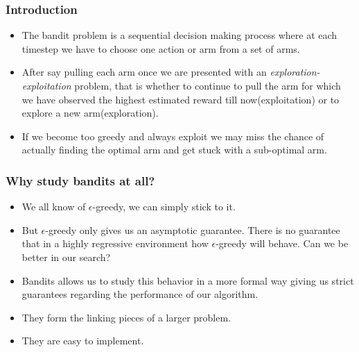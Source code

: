 \begin{frame}
\frametitle{Introduction}
\begin{itemize}
\item<1-> The bandit problem is a sequential decision making process where at each timestep we have to choose one action or arm from a set of arms. 
\item<2-> After say pulling each arm once we are presented with an \emph{exploration-exploitation}  problem, that is whether to continue to pull the arm for which we have observed the highest estimated reward till now(exploitation) or to explore a new arm(exploration). 
\item<3-> If we become too greedy and always exploit we may miss the chance of actually finding the optimal arm and get stuck with a sub-optimal arm.
\end{itemize}
\end{frame}

\begin{frame}
\frametitle{Why study bandits at all?}
\begin{itemize}
\item<1-> We all know of $\epsilon$-greedy, we can simply stick to it.
\item<2-> But $\epsilon$-greedy only gives us an asymptotic guarantee. There is no guarantee that in a highly regressive environment how $\epsilon$-greedy will behave. Can we be better in our search?
\item<3-> Bandits allows us to study this behavior in a more formal way giving us strict guarantees regarding the performance of our algorithm.
\item<4-> They form the linking pieces of a larger problem.
\item<5-> They are easy to implement.    
\end{itemize}
\end{frame}